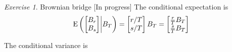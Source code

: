 \documentclass[12pt,a4paper]{amsart}
\theoremstyle{plain}%
\theoremstyle{definition}
\theoremstyle{remark}
\newtheorem{exercise}{Exercise}
\begin{document}
\begin{exercise}{Brownian bridge} [In progress]
The conditional expectation is
\begin{equation*}
  \operatorname{E}\left(\begin{bmatrix}
    B_r \\ B_s
  \end{bmatrix} \middle| B_T\right) = \begin{bmatrix}
      r/T \\ s/T
    \end{bmatrix} B_T = \begin{bmatrix}
      \frac r T B_T \\ \frac sT B_T
    \end{bmatrix} 
\end{equation*}

The conditional variance is 
\end{exercise}


\vfill

%

\end{document}
